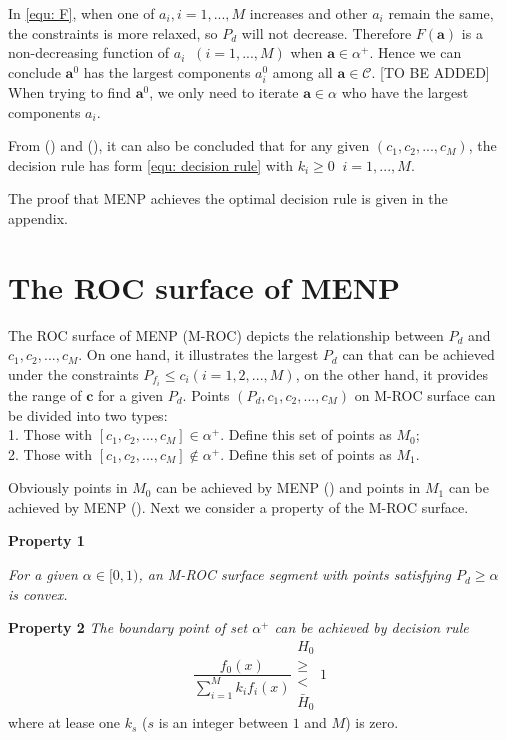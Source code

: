 \documentclass[12pt,journal,a4paper,twoside,onecolumn]{IEEEtran}
\newcommand{\rmnum}[1]{\romannumeral #1}
\begin{document}
\begin{spacing}{2.5}
In \eqref{equ: F}, when one of $a_i, i = 1, ..., M$ increases and other $a_i$ remain the same, the constraints is more relaxed, so $P_d$ will not decrease. Therefore $F(\mathbf{a})$ is a non-decreasing function of $a_i\;\;(i = 1, ..., M)$ when $\mathbf{a} \in \alpha^+$. Hence we can conclude $\mathbf{a}^0$ has the largest components $a_i^0$ among all $\mathbf{a} \in \mathcal{C}$. 
[TO BE ADDED]
When trying to find $\mathbf{a}^0$, we only need to iterate $\mathbf{a} \in \alpha$ who have the largest components $a_i$.

From (\rmnum{1}) and (\rmnum{2}), it can also be concluded that for any given $(c_1, c_2, ..., c_M)$, the decision rule has form  \eqref{equ: decision rule} with $k_i \geq 0\;\;i=1, ..., M$.

The proof that MENP achieves the optimal decision rule is given in the appendix.

\section{The ROC surface of MENP}

The ROC surface of MENP (M-ROC) depicts the relationship between $P_d$ and $c_1, c_2, ..., c_M$. On one hand, it  illustrates the largest $P_d$ can that can be achieved under the constraints $P_{f_i} \leq c_i (i = 1, 2, ..., M)$, on the other hand, it provides the range of $\mathbf{c}$ for a given $P_d$.
Points $(P_d, c_1, c_2, ..., c_M)$ on M-ROC  surface can be divided into two types: 
\\1. Those with $[c_1, c_2, ..., c_M] \in \alpha^+$. Define this set of points as $M_0$; 
\\2. Those with $[c_1, c_2, ..., c_M] \notin \alpha^+$. Define this set of points as $M_1$. 

Obviously points in $M_0$ can be achieved by MENP (\rmnum{1}) and points in $M_1$ can  be achieved by MENP (\rmnum{2}). Next we consider a property of the M-ROC surface.

\noindent\textbf{Property 1}

\noindent  \textit{
\noindent For a given $\alpha \in [0,1)$, an M-ROC surface segment with points satisfying $P_d \geq \alpha$ is  convex.
}

\noindent \textbf{Property 2}
\noindent \textit{The boundary point of set $\alpha^+$ can be achieved by decision rule}
\begin{equation}
\label{equ: boundary decision rule}
\frac{f_0(x)}{\sum_{i=1}^{M}k_if_i(x)} \substack{H_0 \\ \geq \\ < \\ \bar{H}_0} 1 
\end{equation}
where at lease one $k_s$ ($s$ is an integer between $1$ and $M$) is zero. 


\end{spacing}
\end{document}
